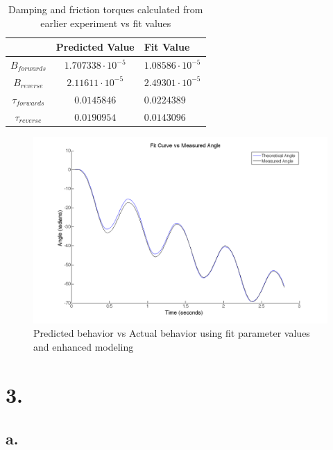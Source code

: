 \documentclass{article}
\theoremstyle{plain}
\theoremstyle{definition}
\theoremstyle{remark}
\begin{document}
\begin{table}[htb]
\begin{center}
    \begin{tabular}{|c|c|l|}
        \hline
        ~                 & Predicted Value          & Fit Value               \\ \hline
        $B_{forwards}$    & $1.707338 \cdot 10^{-5}$ & $1.08586 \cdot 10^{-5}$ \\ 
        $B_{reverse}$     & $2.11611 \cdot 10^{-5}$  & $2.49301 \cdot 10^{-5}$ \\ 
        $\tau_{forwards}$ & $0.0145846$              & $0.0224389$             \\ 
        $\tau_{reverse}$  & $0.0190954$              & $0.0143096$             \\
        \hline
    \end{tabular}
\caption{Damping and friction torques calculated from earlier experiment vs fit values}
\label{q2_b9}
\end{center}
\end{table}

\begin{figure}[htb]
\begin{center}
\includegraphics[width = 14cm]{awesomefitFiner.png}
\caption{Predicted behavior vs Actual behavior using fit parameter values and enhanced modeling}
\label{q2_b3}
\end{center}
\end{figure}

\section*{3.}
\subsection*{a.}
\end{document}
